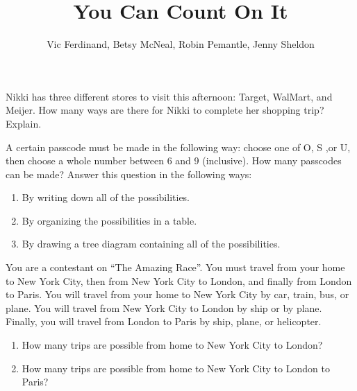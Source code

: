 \documentclass[nooutcomes]{ximera}
\title{You Can Count On It}
\author{Vic Ferdinand, Betsy McNeal, Robin Pemantle, Jenny Sheldon}
\begin{document}
\begin{abstract}
\end{abstract}
\maketitle



\begin{problem}
Nikki has three different stores to visit this afternoon: Target, WalMart, and Meijer.  How many ways are there for Nikki to complete her shopping trip?  Explain.
\end{problem}





\begin{problem}
A certain passcode must be made in the following way: choose one of O, S ,or U, then choose a whole number between 6 and 9 (inclusive).  How many passcodes can be made?  Answer this question in the following ways:
\begin{enumerate}
\item By writing down all of the possibilities.
\item By organizing the possibilities in a table.
\item By drawing a tree diagram containing all of the possibilities.
\end{enumerate}
\end{problem}

\begin{problem}
You are a contestant on ``The Amazing Race''.  You must travel from your home to New York City, then from New York City to London, and finally from London to Paris.  You will travel from your home to New York City by car, train, bus, or plane.  You will travel from New York City to London by ship or by plane.  Finally, you will travel from London to Paris by ship, plane, or helicopter.
\begin{enumerate}
\item How many trips are possible from home to New York City to London?
\item How many trips are possible from home to New York City to London to Paris?
\end{enumerate}
\end{problem}
\end{document}
